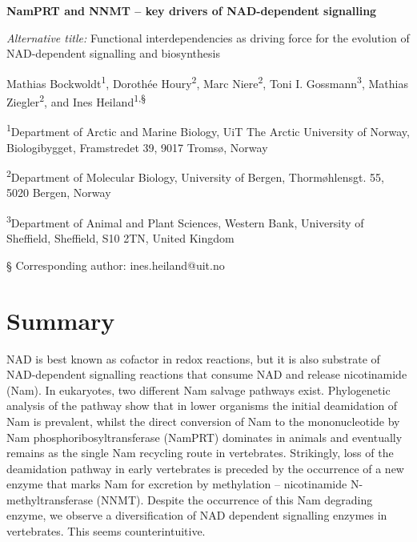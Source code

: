 
\noindent
{\huge\sffamily\bfseries NamPRT and NNMT – key drivers of NAD-dependent signalling \par}

\vspace{15mm}

\noindent
\textit{Alternative title:} Functional interdependencies as driving force for the evolution of NAD-dependent signalling and biosynthesis

\vspace{5mm}

\noindent
Mathias Bockwoldt\textsuperscript{1}, Dorothée Houry\textsuperscript{2}, Marc Niere\textsuperscript{2}, Toni I. Gossmann\textsuperscript{3}, Mathias Ziegler\textsuperscript{2}, and Ines Heiland\textsuperscript{1,§}

\vspace{1cm}

\noindent
\textsuperscript{1}Department of Arctic and Marine Biology, UiT The Arctic University of Norway, Biologibygget, Framstredet 39, 9017 Tromsø, Norway

\noindent
\textsuperscript{2}Department of Molecular Biology, University of Bergen, Thormøhlensgt. 55, 5020 Bergen, Norway

\noindent
\textsuperscript{3}Department of Animal and Plant Sciences, Western Bank, University of Sheffield, Sheffield, S10 2TN, United Kingdom

\noindent
§ Corresponding author: ines.heiland@uit.no


\section*{Summary}

NAD is best known as cofactor in redox reactions, but it is also substrate of NAD-dependent signalling reactions that consume NAD and release nicotinamide (Nam). In eukaryotes, two different Nam salvage pathways exist. Phylogenetic analysis of the pathway show that in lower organisms the initial deamidation of Nam is prevalent, whilst the direct conversion of Nam to the mononucleotide by Nam phosphoribosyltransferase (NamPRT) dominates in animals and eventually remains as the single Nam recycling route in vertebrates. Strikingly, loss of the deamidation pathway in early vertebrates is preceded by the occurrence of a new enzyme that marks Nam for excretion by methylation – nicotinamide N-methyltransferase (NNMT).  Despite the occurrence of this Nam degrading enzyme, we observe a diversification of NAD dependent signalling enzymes in vertebrates. This seems counterintuitive.

